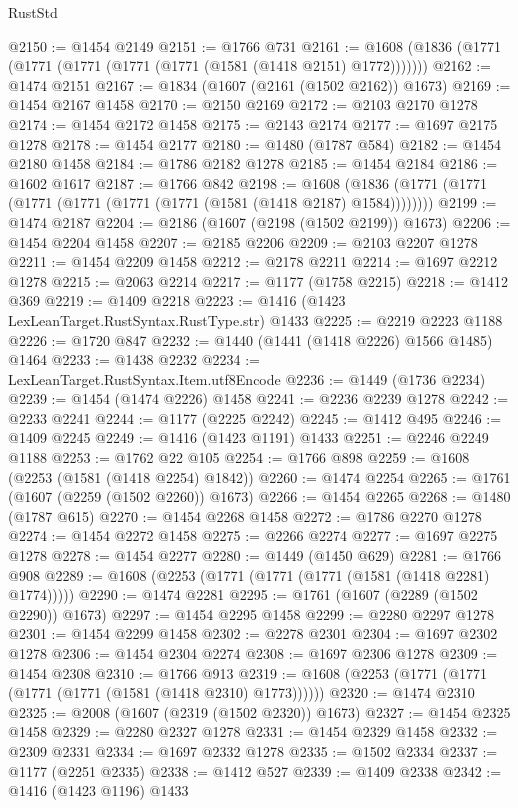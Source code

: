 \begin{lexlean}{RustStd}
\begin{coremodule}
@2150 := @1454 @2149
@2151 := @1766 @731
@2161 := @1608 (@1836 (@1771 (@1771 (@1771 (@1771 (@1771 (@1581 (@1418 @2151) @1772)))))))
@2162 := @1474 @2151
@2167 := @1834 (@1607 (@2161 (@1502 @2162)) @1673)
@2169 := @1454 @2167 @1458
@2170 := @2150 @2169
@2172 := @2103 @2170 @1278
@2174 := @1454 @2172 @1458
@2175 := @2143 @2174
@2177 := @1697 @2175 @1278
@2178 := @1454 @2177
@2180 := @1480 (@1787 @584)
@2182 := @1454 @2180 @1458
@2184 := @1786 @2182 @1278
@2185 := @1454 @2184
@2186 := @1602 @1617
@2187 := @1766 @842
@2198 := @1608 (@1836 (@1771 (@1771 (@1771 (@1771 (@1771 (@1771 (@1581 (@1418 @2187) @1584))))))))
@2199 := @1474 @2187
@2204 := @2186 (@1607 (@2198 (@1502 @2199)) @1673)
@2206 := @1454 @2204 @1458
@2207 := @2185 @2206
@2209 := @2103 @2207 @1278
@2211 := @1454 @2209 @1458
@2212 := @2178 @2211
@2214 := @1697 @2212 @1278
@2215 := @2063 @2214
@2217 := @1177 (@1758 @2215)
@2218 := @1412 @369
@2219 := @1409 @2218
@2223 := @1416 (@1423 LexLeanTarget.RustSyntax.RustType.str) @1433
@2225 := @2219 @2223 @1188
@2226 := @1720 @847
@2232 := @1440 (@1441 (@1418 @2226) @1566 @1485) @1464
@2233 := @1438 @2232
@2234 := LexLeanTarget.RustSyntax.Item.utf8Encode
@2236 := @1449 (@1736 @2234)
@2239 := @1454 (@1474 @2226) @1458
@2241 := @2236 @2239 @1278
@2242 := @2233 @2241
@2244 := @1177 (@2225 @2242)
@2245 := @1412 @495
@2246 := @1409 @2245
@2249 := @1416 (@1423 @1191) @1433
@2251 := @2246 @2249 @1188
@2253 := @1762 @22 @105
@2254 := @1766 @898
@2259 := @1608 (@2253 (@1581 (@1418 @2254) @1842))
@2260 := @1474 @2254
@2265 := @1761 (@1607 (@2259 (@1502 @2260)) @1673)
@2266 := @1454 @2265
@2268 := @1480 (@1787 @615)
@2270 := @1454 @2268 @1458
@2272 := @1786 @2270 @1278
@2274 := @1454 @2272 @1458
@2275 := @2266 @2274
@2277 := @1697 @2275 @1278
@2278 := @1454 @2277
@2280 := @1449 (@1450 @629)
@2281 := @1766 @908
@2289 := @1608 (@2253 (@1771 (@1771 (@1771 (@1581 (@1418 @2281) @1774)))))
@2290 := @1474 @2281
@2295 := @1761 (@1607 (@2289 (@1502 @2290)) @1673)
@2297 := @1454 @2295 @1458
@2299 := @2280 @2297 @1278
@2301 := @1454 @2299 @1458
@2302 := @2278 @2301
@2304 := @1697 @2302 @1278
@2306 := @1454 @2304 @2274
@2308 := @1697 @2306 @1278
@2309 := @1454 @2308
@2310 := @1766 @913
@2319 := @1608 (@2253 (@1771 (@1771 (@1771 (@1771 (@1581 (@1418 @2310) @1773))))))
@2320 := @1474 @2310
@2325 := @2008 (@1607 (@2319 (@1502 @2320)) @1673)
@2327 := @1454 @2325 @1458
@2329 := @2280 @2327 @1278
@2331 := @1454 @2329 @1458
@2332 := @2309 @2331
@2334 := @1697 @2332 @1278
@2335 := @1502 @2334
@2337 := @1177 (@2251 @2335)
@2338 := @1412 @527
@2339 := @1409 @2338
@2342 := @1416 (@1423 @1196) @1433

\end{coremodule}
\end{lexlean}
